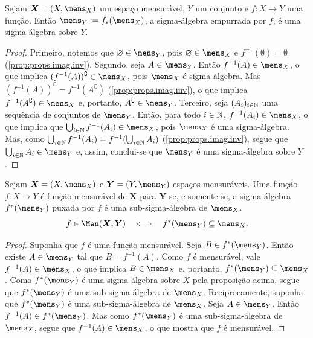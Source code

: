 \begin{prop}
Sejam $\bm X = (X,\mens_X)$ um espaço mensurável, $Y$ um conjunto e $f: X \to Y$ uma função. Então $\mens_Y := f_*(\mens_X)$, a sigma-álgebra empurrada por $f$, é uma sigma-álgebra sobre $Y$.
\end{prop}
\begin{proof}
Primeiro, notemos que $\emptyset \in \mens_Y$, pois $\emptyset \in \mens_X$ e $f^{-1}(\emptyset) = \emptyset$ (\ref{prop:props.imag.inv}). Segundo, seja $A \in \mens_Y$. Então $f^{-1}(A) \in \mens_ X$, o que implica $(f^{-1}(A))^\complement \in \mens_ X$, pois $\mens_ X$ é sigma-álgebra. Mas $(f^{-1}(A))^\complement = f^{-1}(A^\complement)$ (\ref{prop:props.imag.inv}), o que implica $f^{-1}(A^\complement) \in \mens_ X$ e, portanto, $A^\complement \in \mens_ Y$. Terceiro, seja $(A_i)_{i \in \mathbb{N}}$ uma sequência de conjuntos de $\mens_ Y$. Então, para todo $i \in \mathbb{N}$, $f^{-1}(A_i) \in \mens_ X$, o que implica que $\bigcup_{i \in \N} f^{-1}(A_i) \in \mens_ X$, pois $\mens_ X$ é uma sigma-álgebra. Mas, como $\bigcup_{i \in \mathbb{N}} f^{-1}(A_i) = f^{-1}(\bigcup_{i \in \mathbb{N}} A_i)$ (\ref{prop:props.imag.inv}), segue que $\bigcup_{i \in \N} A_i \in \mens_ Y$ e, assim, conclui-se que $\mens_ Y$ é uma sigma-álgebra sobre $Y$.
\end{proof}

\begin{prop}
Sejam $\bm X = (X,\mens_ X)$ e $\bm Y = (Y,\mens_ Y)$ espaços mensuráveis. Uma função $f: X \to Y$ é função mensurável de $\bm X$ para $\bm Y$ se, e somente se, a sigma-álgebra $f^*(\mens_Y)$ puxada por $f$ é uma sub-sigma-álgebra de $\mens_ X$.
	\begin{equation*}
	f \in \Men(\bm X,\bm Y) \sse f^*(\mens_Y) \subseteq \mens_X.
	\end{equation*}
\end{prop}
\begin{proof}
Suponha que $f$ é uma função mensurável. Seja $B \in f^*(\mens_Y)$. Então existe $A \in \mens_ Y$ tal que $B = f^{-1}(A)$. Como $f$ é mensurável, vale $f^{-1}(A) \in \mens_ X$, o que implica $B \in \mens_ X$ e, portanto, $f^*(\mens_Y) \subseteq \mens_ X$. Como $f^*(\mens_Y)$ é uma sigma-álgebra sobre $X$ pela proposição acima, segue que $f^*(\mens_Y)$ é uma sub-sigma-álgebra de $\mens_ X$. Reciprocamente, suponha que $f^*(\mens_Y)$ é uma sub-sigma-álgebra de $\mens_ X$. Seja $A \in \mens_ Y$. Então $f^{-1}(A) \in f^*(\mens_Y)$. Mas como $f^*(\mens_Y)$ é uma sub-sigma-álgebra de $\mens_ X$, segue que $f^{-1}(A) \in \mens_ X$, o que mostra que $f$ é mensurável.
\end{proof}






